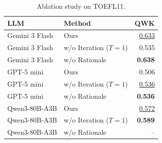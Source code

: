 \begin{table}[t]
\centering
\small
\caption{Ablation study on TOEFL11.}
\begin{tabular}{llr}
\toprule
LLM & Method & QWK \\
\midrule
Gemini 3 Flash & Ours & \underline{0.633} \\
Gemini 3 Flash & w/o Iteration ($T=1$) & 0.535 \\
Gemini 3 Flash & w/o Rationale & \textbf{0.638} \\
\midrule
GPT-5 mini & Ours & 0.506 \\
GPT-5 mini & w/o Iteration ($T=1$) & \underline{0.536} \\
GPT-5 mini & w/o Rationale & \textbf{0.536} \\
\midrule
Qwen3-80B-A3B & Ours & \underline{0.572} \\
Qwen3-80B-A3B & w/o Iteration ($T=1$) & \textbf{0.589} \\
Qwen3-80B-A3B & w/o Rationale & -- \\
\bottomrule
\end{tabular}
\end{table}
